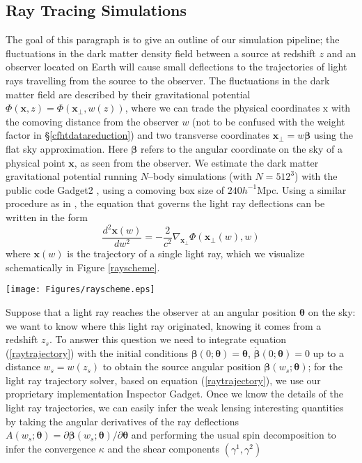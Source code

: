 \documentclass[reprint,aps,prd,superscriptaddress,showkeys]{revtex4-1}
\begin{document}
\subsection{Ray Tracing Simulations}
\label{raysim}
The goal of this paragraph is to give an outline of our simulation pipeline; the fluctuations in the dark matter density field between a source at redshift $z$ and an observer located on Earth will cause small deflections to the trajectories of light rays travelling from the source to the observer. The fluctuations in the dark matter field are described by their gravitational potential $\Phi(\mathbf{x},z)=\Phi(\mathbf{x}_\perp,w(z))$, where we can trade the physical coordinates $\mathrm{x}$ with the comoving distance from the observer $w$ (not to be confused with the weight factor in \S\ref{cfhtdatareduction}) and two transverse coordinates $\mathbf{x}_\perp=w\pmb{\beta}$ using the flat sky approximation. Here $\pmb{\beta}$ refers to the angular coordinate on the sky of a physical point $\mathbf{x}$, as seen from the observer. We estimate the dark matter gravitational potential running $N$--body simulations (with $N=512^3$) with the public code Gadget2 \citep{Gadget2}, using a comoving box size of $240h^{-1}$Mpc. Using a similar procedure as in \citep{RayTracingJain,RayTracingHartlap}, the equation that governs the light ray deflections can be written in the form
\begin{equation}
\label{raytrajectory}
\frac{d^2\mathbf{x}(w)}{dw^2} = -\frac{2}{c^2}\nabla_{\mathbf{x}_\perp}\Phi(\mathbf{x}_\perp(w),w)
\end{equation}
%
where $\mathbf{x}(w)$ is the trajectory of a single light ray, which we visualize schematically in Figure \ref{rayscheme}. 
%
\begin{figure*}
\begin{center}
\texttt{[image: Figures/rayscheme.eps]}
\end{center}
\caption{Schematics of ray tracing with the lensing potential boosted by a factor of 50 for visualization purposes}
\label{rayscheme}
\end{figure*}
%
Suppose that a light ray reaches the observer at an angular position $\pmb{\theta}$ on the sky: we want to know where this light ray originated, knowing it comes from a redshift $z_s$. To answer this question we need to integrate equation (\ref{raytrajectory}) with the initial conditions $\pmb{\beta}(0;\pmb{\theta})=\pmb{\theta}$, $\dot{\pmb{\beta}}(0;\pmb{\theta})=0$ up to a distance $w_s=w(z_s)$ to obtain the source angular position $\pmb{\beta}(w_s;\pmb{\theta})$; for the light ray trajectory solver, based on equation (\ref{raytrajectory}), we use our proprietary implementation Inspector Gadget. Once we know the details of the light ray trajectories, we can easily infer the weak lensing interesting quantities by taking the angular derivatives of the ray deflections $A(w_s;\pmb{\theta}) = \partial \pmb{\beta}(w_s;\pmb{\theta})/\partial\pmb{\theta}$ and performing the usual spin decomposition to infer the convergence $\kappa$ and the shear components $(\gamma^1,\gamma^2)$
\end{document}
